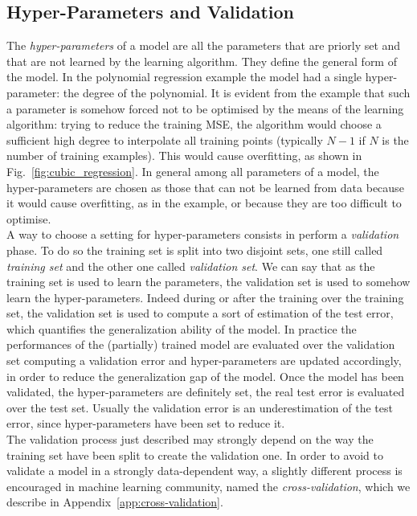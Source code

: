 \subsection{Hyper-Parameters and Validation}\label{sec:validation}
The \emph{hyper-parameters} of a model are all the parameters that are priorly set and that are not learned by the learning algorithm. They define the general form of the model. In the polynomial regression example the model had a single hyper-parameter: the degree of the polynomial. It is evident from the example that such a parameter is somehow forced not to be optimised by the means of the learning algorithm: trying to reduce the training MSE, the algorithm would choose a sufficient high degree to interpolate all training points (typically $N-1$ if $N$ is the number of training examples). This would cause overfitting, as shown in Fig.~\ref{fig:cubic_regression}. In general among all parameters of a model, the hyper-parameters are chosen as those that can not be learned from data because it would cause overfitting, as in the example, or because they are too difficult to optimise. \\
A way to choose a setting for hyper-parameters consists in perform a \emph{validation} phase. To do so the training set is split into two disjoint sets, one still called \emph{training set} and the other one called \emph{validation set}. We can say that as the training set is used to learn the parameters, the validation set is used to somehow learn the hyper-parameters. Indeed during or after the training over the training set, the validation set is used to compute a sort of estimation of the test error, which quantifies the generalization ability of the model. In practice the performances of the (partially) trained model are evaluated over the validation set computing a validation error and hyper-parameters are updated accordingly, in order to reduce the generalization gap of the model. Once the model has been validated, \ie the hyper-parameters are definitely set, the real test error is evaluated over the test set. Usually the validation error is an underestimation of the test error, since hyper-parameters have been set to reduce it. \\
The validation process just described may strongly depend on the way the training set have been split to create the validation one. In order to avoid to validate a model in a strongly data-dependent way, a slightly different process is encouraged in machine learning community, named the \emph{cross-validation}, which we describe in Appendix~\ref{app:cross-validation}.


